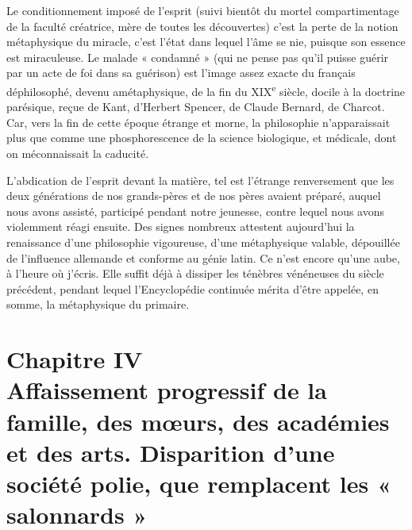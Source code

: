 \documentclass[french,twoside]{book} %
\newcommand\chapteropen{} %
\newcommand\chapterclose{} %
\renewcommand\chapteropen{} %
\renewcommand\chapterclose{} %
\begin{document}
Le conditionnement imposé de l’esprit (suivi bientôt du mortel compartimentage de la faculté créatrice, mère de toutes les découvertes) c’est la perte de la notion métaphysique du miracle, c’est l’état dans lequel l’âme se nie, puisque son essence est miraculeuse. Le malade « condamné » (qui ne pense pas qu’il puisse guérir par un acte de foi dans sa guérison) est l’image assez exacte du français déphilosophé, devenu amétaphysique, de la fin du XIX\textsuperscript{e} siècle, docile à la doctrine parésique, reçue de Kant, d’Herbert Spencer, de Claude Bernard, de Charcot. Car, vers la fin de cette époque étrange et morne, la philosophie n’apparaissait plus que comme une phosphorescence de la science biologique, et médicale, dont on méconnaissait la caducité.\par
L’abdication de l’esprit devant la matière, tel est l’étrange renversement que les deux générations de nos grands-pères et de nos pères avaient préparé, auquel nous avons assisté, participé pendant notre jeunesse, contre lequel nous avons violemment réagi ensuite. Des signes nombreux attestent aujourd’hui la renaissance d’une philosophie vigoureuse, d’une métaphysique valable, dépouillée de l’influence allemande et conforme au génie latin. Ce n’est encore qu’une aube, à l’heure où j’écris. Elle suffit déjà à dissiper les ténèbres vénéneuses du siècle précédent, pendant lequel l’Encyclopédie continuée mérita d’être appelée, en somme, la métaphysique du primaire.
\chapterclose


\chapteropen
\chapter[Chapitre IV. Affaissement progressif de la famille, des mœurs, des académies et des arts. Disparition d’une société polie, que remplacent les « salonnards »]{Chapitre IV{\hskip1pt}\\{}Affaissement progressif de la famille, des mœurs, des académies et des arts. Disparition d’une société polie, que remplacent les « salonnards »}
\end{document}
